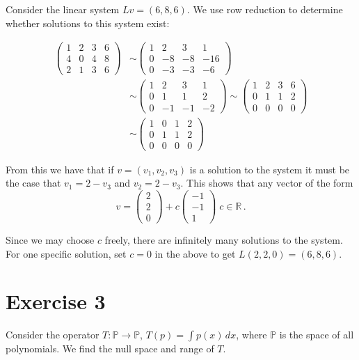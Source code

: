 \documentclass[11pt]{article}
\begin{document}
Consider the linear system $Lv = (6,8,6)$. We use row reduction to determine whether solutions to this system exist:

\begin{align*}
\begin{pmatrix} 1&2&3&6 \\ 4&0&4&8\\ 2&1&3&6 \end{pmatrix} &\sim \begin{pmatrix} 1&2&3&1 \\ 0&-8&-8&-16\\ 0&-3&-3&-6 \end{pmatrix} \\
&\sim \begin{pmatrix} 1&2&3&1 \\ 0&1&1&2\\ 0&-1&-1&-2 \end{pmatrix} \sim \begin{pmatrix} 1&2&3&6 \\ 0&1&1&2\\ 0&0&0&0 \end{pmatrix} \\
&\sim \begin{pmatrix} 1&0&1&2 \\ 0&1&1&2\\ 0&0&0&0 \end{pmatrix}
\end{align*}

From this we have that if $v = (v_1,v_2,v_3)$ is a solution to the system it must be the case that $v_1 = 2-v_3$ and $v_2 = 2-v_3$. This shows that any vector of the form
$$v = \begin{pmatrix} 2\\2\\0 \end{pmatrix} + c\begin{pmatrix}
-1\\-1\\1
\end{pmatrix} \; c \in \mathbb{R} \,.$$

Since we may choose $c$ freely, there are infinitely many solutions to the system. For one specific solution, set $c=0$ in the above to get $L(2,2,0) = (6,8,6)$. 

\section*{Exercise 3}

Consider the operator $T: \mathbb{P} \rightarrow \mathbb{P}$, $T(p) = \int p(x) \, dx $, where $\mathbb{P}$ is the space of all polynomials. We find the null space and range of $T$.\\
\end{document}
